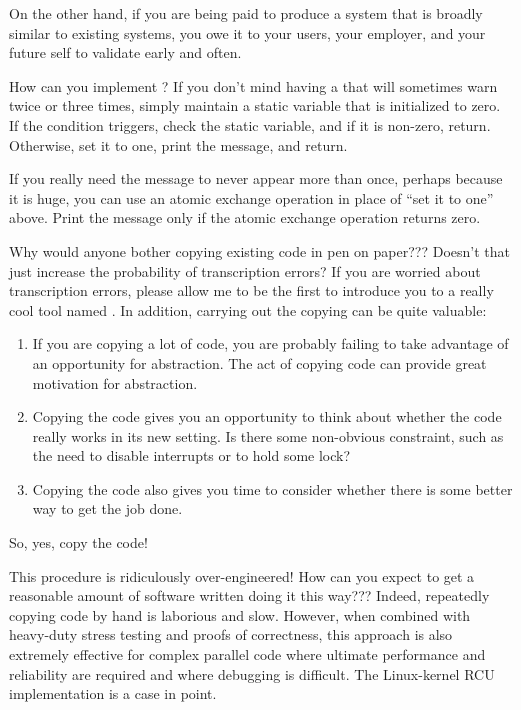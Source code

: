 \begin{enumerate}
	On the other hand, if you are being paid to produce a system that
	is broadly similar to existing systems, you owe it to your users,
	your employer, and your future self to validate early and often.

\QuickQ{}
	How can you implement ?
\QuickA{}
	If you don't mind having a  that
	will sometimes warn twice or three times, simply maintain
	a static variable that is initialized to zero.
	If the condition triggers, check the static variable, and
	if it is non-zero, return.
	Otherwise, set it to one, print the message, and return.

	If you really need the message to never appear more than once,
	perhaps because it is huge, you can use an atomic exchange
	operation in place of ``set it to one'' above.
	Print the message only if the atomic exchange operation returns
	zero.

\QuickQ{}
	Why would anyone bother copying existing code in pen on paper???
	Doesn't that just increase the probability of transcription errors?
\QuickA{}
	If you are worried about transcription errors, please allow me
	to be the first to introduce you to a really cool tool named
	.
	In addition, carrying out the copying can be quite valuable:
	\begin{enumerate}
	\item	If you are copying a lot of code, you are probably failing
		to take advantage of an opportunity for abstraction.
		The act of copying code can provide great motivation
		for abstraction.
	\item	Copying the code gives you an opportunity to think about
		whether the code really works in its new setting.
		Is there some non-obvious constraint, such as the need
		to disable interrupts or to hold some lock?
	\item	Copying the code also gives you time to consider whether
		there is some better way to get the job done.
	\end{enumerate}
	So, yes, copy the code!

\QuickQ{}
	This procedure is ridiculously over-engineered!
	How can you expect to get a reasonable amount of software
	written doing it this way???
\QuickA{}
	Indeed, repeatedly copying code by hand is laborious and slow.
	However, when combined with heavy-duty stress testing and
	proofs of correctness, this approach is also extremely effective
	for complex parallel code where ultimate performance and
	reliability are required and where debugging is difficult.
	The Linux-kernel RCU implementation is a case in point.


\end{enumerate}
